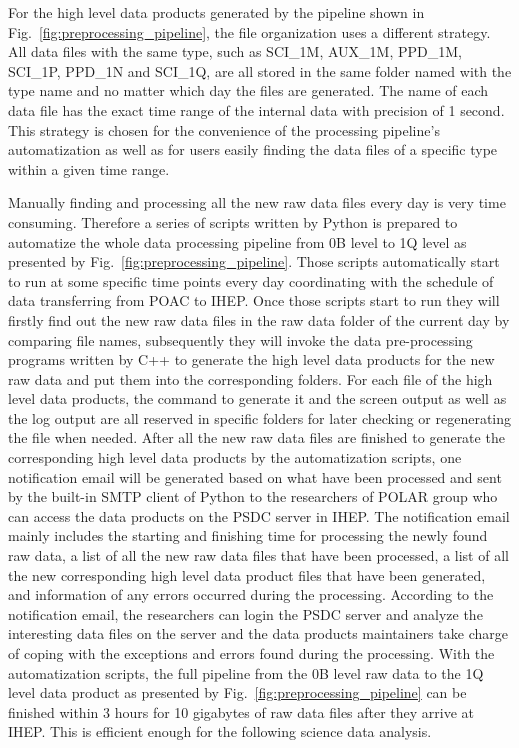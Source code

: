 \documentclass{raa}
\begin{document}
For the high level data products generated by the pipeline shown in Fig.~\ref{fig:preprocessing_pipeline}, the file organization uses a different strategy. All data files with the same type, such as SCI\_1M, AUX\_1M, PPD\_1M, SCI\_1P, PPD\_1N and SCI\_1Q, are all stored in the same folder named with the type name and no matter which day the files are generated. The name of each data file has the exact time range of the internal data with precision of 1 second. This strategy is chosen for the convenience of the processing pipeline's automatization as well as for users easily finding the data files of a specific type within a given time range.

Manually finding and processing all the new raw data files every day is very time consuming. Therefore a series of scripts written by Python is prepared to automatize the whole data processing pipeline from 0B level to 1Q level as presented by Fig.~\ref{fig:preprocessing_pipeline}. Those scripts automatically start to run at some specific time points every day coordinating with the schedule of data transferring from POAC to IHEP. Once those scripts start to run they will firstly find out the new raw data files in the raw data folder of the current day by comparing file names, subsequently they will invoke the data pre-processing programs written by C++ to generate the high level data products for the new raw data and put them into the corresponding folders. For each file of the high level data products, the command to generate it and the screen output as well as the log output are all reserved in specific folders for later checking or regenerating the file when needed. After all the new raw data files are finished to generate the corresponding high level data products by the automatization scripts, one notification email will be generated based on what have been processed and sent by the built-in SMTP client of Python to the researchers of POLAR group who can access the data products on the PSDC server in IHEP. The notification email mainly includes the starting and finishing time for processing the newly found raw data, a list of all the new raw data files that have been processed, a list of all the new corresponding high level data product files that have been generated, and information of any errors occurred during the processing. According to the notification email, the researchers can login the PSDC server and analyze the interesting data files on the server and the data products maintainers take charge of coping with the exceptions and errors found during the processing. With the automatization scripts, the full pipeline from the 0B level raw data to the 1Q level data product as presented by Fig.~\ref{fig:preprocessing_pipeline} can be finished within 3 hours for 10 gigabytes of raw data files after they arrive at IHEP. This is efficient enough for the following science data analysis.
\end{document}
